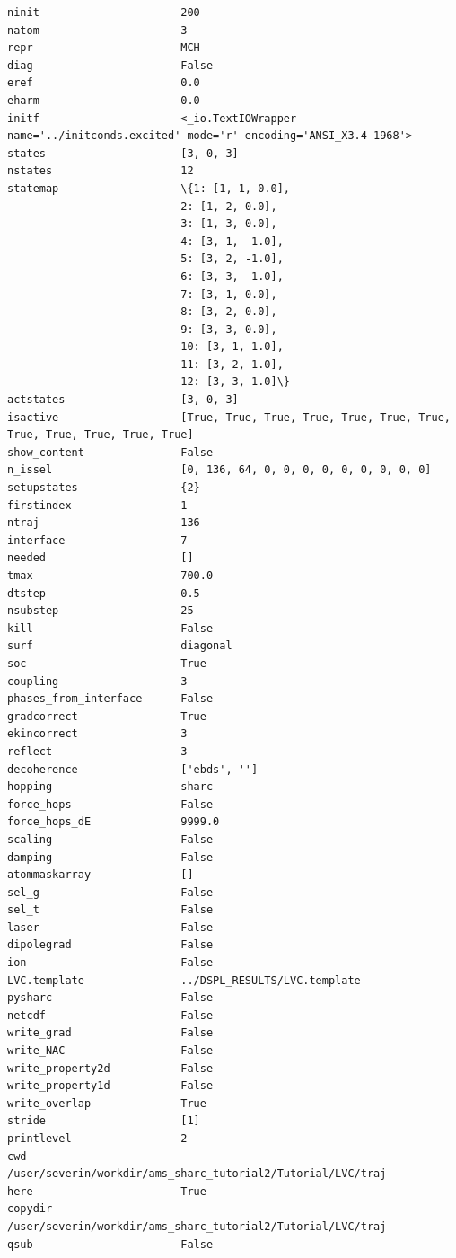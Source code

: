 \documentclass[a4paper,11pt,DIV=15,openany]{scrbook}
\begin{document}
\begin{oframed}
\begin{Verbatim}[commandchars=\\\{\}]
ninit                      200
natom                      3
repr                       MCH
diag                       False
eref                       0.0
eharm                      0.0
initf                      <_io.TextIOWrapper name='../initconds.excited' mode='r' encoding='ANSI_X3.4-1968'>
states                     [3, 0, 3]
nstates                    12
statemap                   \{1: [1, 1, 0.0], 
                           2: [1, 2, 0.0], 
                           3: [1, 3, 0.0], 
                           4: [3, 1, -1.0], 
                           5: [3, 2, -1.0], 
                           6: [3, 3, -1.0], 
                           7: [3, 1, 0.0], 
                           8: [3, 2, 0.0], 
                           9: [3, 3, 0.0], 
                           10: [3, 1, 1.0], 
                           11: [3, 2, 1.0], 
                           12: [3, 3, 1.0]\}
actstates                  [3, 0, 3]
isactive                   [True, True, True, True, True, True, True, True, True, True, True, True]
show_content               False
n_issel                    [0, 136, 64, 0, 0, 0, 0, 0, 0, 0, 0, 0]
setupstates                {2}
firstindex                 1
ntraj                      136
interface                  7
needed                     []
tmax                       700.0
dtstep                     0.5
nsubstep                   25
kill                       False
surf                       diagonal
soc                        True
coupling                   3
phases_from_interface      False
gradcorrect                True
ekincorrect                3
reflect                    3
decoherence                ['ebds', '']
hopping                    sharc
force_hops                 False
force_hops_dE              9999.0
scaling                    False
damping                    False
atommaskarray              []
sel_g                      False
sel_t                      False
laser                      False
dipolegrad                 False
ion                        False
LVC.template               ../DSPL_RESULTS/LVC.template
pysharc                    False
netcdf                     False
write_grad                 False
write_NAC                  False
write_property2d           False
write_property1d           False
write_overlap              True
stride                     [1]
printlevel                 2
cwd                        /user/severin/workdir/ams_sharc_tutorial2/Tutorial/LVC/traj
here                       True
copydir                    /user/severin/workdir/ams_sharc_tutorial2/Tutorial/LVC/traj
qsub                       False


\end{Verbatim}
\end{oframed}
\end{document}
